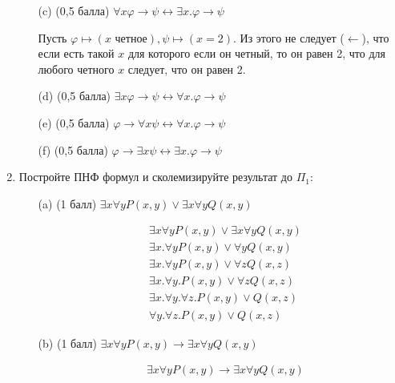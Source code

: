 \begin{enumerate}
\begin{itemize}
        \item[(c)] (0,5 балла) $\forall x\varphi \rightarrow \psi \leftrightarrow \exists x. \varphi \rightarrow \psi$
        \begin{solution}
            Пусть $\varphi \mapsto (x \text{ четное}), \psi \mapsto (x = 2)$. Из этого не следует ($\leftarrow$), что если есть такой $x$ для которого если он четный, то он равен 2, что для любого четного $x$ следует, что он равен 2.
        \end{solution}
        \item[(d)] (0,5 балла) $\exists x\varphi \rightarrow \psi \leftrightarrow \forall x. \varphi \rightarrow \psi$
        \item[(e)] (0,5 балла) $\varphi \rightarrow \forall x\psi \leftrightarrow \forall x. \varphi \rightarrow \psi$
        \item[(f)] (0,5 балла) $\varphi \rightarrow \exists x\psi \leftrightarrow \exists x. \varphi \rightarrow \psi$
    \end{itemize}
    \item Постройте ПНФ формул и сколемизируйте результат до $\Pi_1$:
    \begin{itemize}
        \item[(a)] (1 балл) $\exists x\forall y P(x, y) \lor \exists x\forall y Q(x, y)$
        \begin{solution}
            \begin{align*}
                &\exists x\forall y P(x, y) \lor \exists x\forall y Q(x, y) \\
                &\exists x . \forall y P(x, y) \lor \forall y Q(x, y) \\
                &\exists x . \forall y P(x, y) \lor \forall z Q(x, z) \\
                &\exists x . \forall y. P(x, y) \lor \forall z Q(x, z) \\
                &\exists x . \forall y. \forall z . P(x, y) \lor Q(x, z) \\
                &\forall y. \forall z . P(x, y) \lor Q(x, z)
            \end{align*}
        \end{solution}
        \item[(b)] (1 балл) $\exists x\forall y P(x, y) \rightarrow \exists x\forall y Q(x, y)$
        \begin{solution}
            \begin{align*}
                &\exists x\forall y P(x, y) \rightarrow \exists x\forall y Q(x, y) \\

\end{align*}
\end{solution}
\end{itemize}
\end{enumerate}

